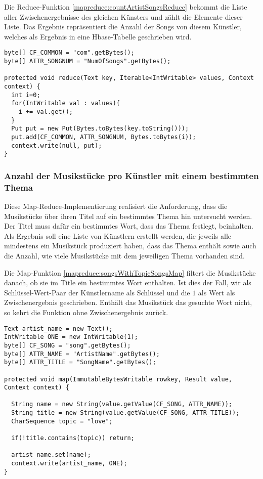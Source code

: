 Die Reduce-Funktion \ref{mapreduce:countArtistSongsReduce} bekommt die Liste aller
Zwischenergebnisse des gleichen Künsters und zählt die Elemente dieser Liste. Das Ergebnis
repräsentiert die Anzahl der Songs von diesem Künstler, welches als Ergebnis in eine 
Hbase-Tabelle geschrieben wird.

\begin{lstlisting}[caption={Reduce-Funktion zur Anzahl der Musikstücke pro Künstler}, label=mapreduce:countArtistSongsReduce]
byte[] CF_COMMON = "com".getBytes();
byte[] ATTR_SONGNUM = "NumOfSongs".getBytes();

protected void reduce(Text key, Iterable<IntWritable> values, Context context) {
  int i=0;
  for(IntWritable val : values){
    i += val.get();
  }          
  Put put = new Put(Bytes.toBytes(key.toString()));
  put.add(CF_COMMON, ATTR_SONGNUM, Bytes.toBytes(i));
  context.write(null, put);
}
\end{lstlisting}

\subsubsection{Anzahl der Musikstücke pro Künstler mit einem bestimmten Thema}
\label{mapred:sec:topicSongs}
Diese Map-Reduce-Implementierung realisiert die Anforderung, dass die Musikstücke über
ihren Titel auf ein bestimmtes Thema hin untersucht werden. Der Titel muss dafür ein bestimmtes
Wort, dass das Thema festlegt, beinhalten. Als Ergebnis soll eine Liste von Künstlern erstellt werden,
die jeweils alle mindestens ein Musikstück produziert haben, dass das Thema enthält sowie auch
die Anzahl, wie viele Musikstücke mit dem jeweiligen Thema vorhanden sind.

Die Map-Funktion \ref{mapreduce:songsWithTopicSongsMap} filtert die Musikstücke danach, ob sie im Title ein bestimmtes Wort enthalten.
Ist dies der Fall, wir als Schlüssel-Wert-Paar der Künstlername als Schlüssel und die $1$ als 
Wert als Zwischenergebnis geschrieben. Enthält das Musikstück das gesuchte Wort nicht,
so kehrt die Funktion ohne Zwischenergebnis zurück.

\begin{lstlisting}[caption={Map-Funktion zur Suche nach Musikstücken eines Themas}, label=mapreduce:songsWithTopicSongsMap]
Text artist_name = new Text();
IntWritable ONE = new IntWritable(1);
byte[] CF_SONG = "song".getBytes();
byte[] ATTR_NAME = "ArtistName".getBytes();
byte[] ATTR_TITLE = "SongName".getBytes();
        
protected void map(ImmutableBytesWritable rowkey, Result value, Context context) {
            
  String name = new String(value.getValue(CF_SONG, ATTR_NAME));
  String title = new String(value.getValue(CF_SONG, ATTR_TITLE));          
  CharSequence topic = "love";
            
  if(!title.contains(topic)) return;
            
  artist_name.set(name);
  context.write(artist_name, ONE);
}
\end{lstlisting}


